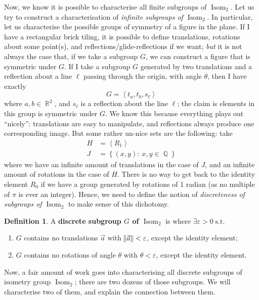 \documentclass[11pt]{amsart} %
\theoremstyle{definition}
\newtheorem{definition}{Definition}[section]
\theoremstyle{definition}
\DeclareMathOperator{\Q}{\mathbb{Q}}
\DeclareMathOperator{\R}{\mathbb{R}}
\DeclareMathOperator{\suchthat}{\text{ s.t. }}
\DeclareMathOperator{\isom}{Isom}
\numberwithin{equation}{section}
\newcommand{\condset}[4]{\left\{ #1  : \: #2 #3 #4 \right\}}
\newcommand{\cyclic}[1]{\left\langle #1 \right\rangle}
\begin{document}
Now, we know it is possible to characterise all finite subgroups of $\isom_2$. Let us try to construct a characterisation of \textit{infinite subgroups of $\isom_2$}. In particular, let us characterise the possible groups of symmetry of a figure in the plane. If I have a rectangular brick tiling, it is possible to define translations, rotations about some point(s), and reflections/glide-reflections if we want; \textit{but} it is not always the case that, if we take a subgroup $G$, we can construct a figure that is symmetric under $G$. If I take a subgroup $G$ generated by two translations and a reflection about a line $\ell$ passing through the origin, with angle $\theta$, then I have exactly
$$G = \left\langle t_a , t_b , s_\ell \right\rangle  $$
where $a,b \in \R^2$, and $s_\ell$ is a reflection about the line $\ell$; the claim is elements in this group is symmetric under $G$. We know this because everything plays out ``nicely'': translations are easy to manipulate, and reflections always produce one corresponding image. But some rather un-nice sets are the following: take
\begin{align*}
	H &=  \cyclic{R_1}  \\
	J &= \condset{ \left(x,y\right)}{x,y}{ \in }{ \Q} 
\end{align*}
where we have an infinite amount of translations in the case of $J$, and an infinite amount of rotations in the case of $H$. There is no way to get back to the identity element $R_0$ if we have a group generated by rotations of 1 radian (as no multiple of $\pi$ is ever an integer). Hence, we need to define the notion of \textit{discreteness of subgroups of $\isom_2$} to make sense of this dichotomy.

\begin{definition}
	A \textbf{discrete subgroup $G$ of $\isom_2$} is where $\exists \varepsilon>0 \suchthat $
	\begin{enumerate}%
		\item $G$ contains no translations $\vec{a} $ with $\norm{\vec{a}} < \varepsilon$, except the identity element;
		\item $G$ contains no rotations of angle $\theta$ with $\theta < \varepsilon$, except the identity element.
	\end{enumerate}
\end{definition}

Now, a fair amount of work goes into characterising all discrete subgroups of isometry group $\isom_2$; there are two dozens of those subgroups. We will characterise two of them, and explain the connection between them.
\end{document}
